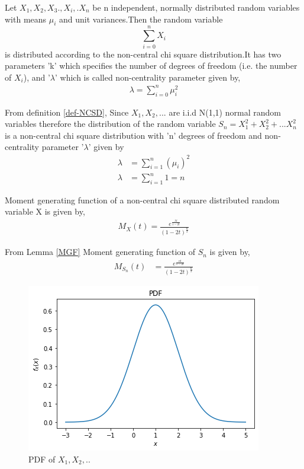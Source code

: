 \documentclass[journal,12pt,twocolumn]{IEEEtran}
\begin{document}
\begin{definition}
Let $X_{1},X_{2},X_{3}.,X_{i},.X_{n}$ be n independent, normally distributed random variables with means $\mu_{i}$ and unit variances.Then the random variable
$$\sum_{i=0}^{n}X_{i}$$ is distributed according to the non-central chi square distribution.It has two parameters 'k' which specifies the number of degrees of freedom (i.e. the number of $X_{i}$), and '$\lambda$' which is called non-centrality parameter given by,
\begin{align}
    \lambda=\sum_{i=0}^{n}\mu_{i}^2
\end{align}
\label{def-NCSD}
\end{definition}
From definition \ref{def-NCSD},
Since $X_{1},X_{2},...$ are i.i.d N(1,1) normal random variables therefore the distribution of the random variable $S_{n}=X_{1}^{2}+X_{2}^{2}+...X_{n}^{2}$ is a non-central chi square distribution with 'n' degrees of freedom and non-centrality parameter '$\lambda$' given by
\begin{align}
    \lambda&=\sum_{i=1}^{n}(\mu_{i})^{2}
    \\\lambda&=\sum_{i=1}^{n}1=n
    \end{align}
\begin{lemma}
Moment generating function of a non-central chi square distributed random variable X is given by,
\begin{align}
    M_{X}(t)=\frac{e^{\frac{\lambda t}{1-2t}}}{(1-2t)^{\frac{n}{2}}}
\end{align}
\label{MGF}
\end{lemma}


From Lemma \ref{MGF} Moment generating function of $S_{n}$ is given by,
\begin{align}
    M_{S_{n}}(t)&=\frac{e^{\frac{n t}{1-2t}}}{(1-2t)^{\frac{n}{2}}}
\end{align}


\begin{figure}[h]
 \centering
\includegraphics[width=\columnwidth]{PDF.png}
 \caption{PDF of $X_{1},X_{2},..$}
    \label{fig:my_label}
\end{figure}
\end{document}
